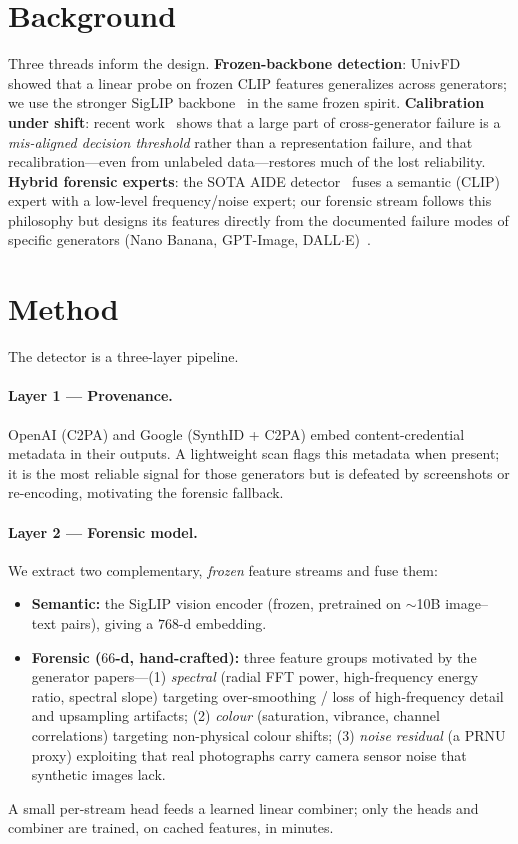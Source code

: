 \documentclass[11pt]{article}
\begin{document}
\section{Background}
Three threads inform the design. \textbf{Frozen-backbone detection}: UnivFD~\cite{univfd}
showed that a linear probe on frozen CLIP features generalizes across generators; we
use the stronger SigLIP backbone~\cite{siglip} in the same frozen spirit.
\textbf{Calibration under shift}: recent work~\cite{calibrated,conformal} shows that a
large part of cross-generator failure is a \emph{mis-aligned decision threshold} rather
than a representation failure, and that recalibration---even from unlabeled
data---restores much of the lost reliability. \textbf{Hybrid forensic experts}: the SOTA
AIDE detector~\cite{aide} fuses a semantic (CLIP) expert with a low-level frequency/noise
expert; our forensic stream follows this philosophy but designs its features directly
from the documented failure modes of specific generators (Nano Banana, GPT-Image,
DALL$\cdot$E)~\cite{nanobanana,gptimgeval,dalle3}.

\section{Method}
The detector is a three-layer pipeline.

\paragraph{Layer 1 --- Provenance.} OpenAI (C2PA) and Google (SynthID + C2PA) embed
content-credential metadata in their outputs. A lightweight scan flags this metadata
when present; it is the most reliable signal for those generators but is defeated by
screenshots or re-encoding, motivating the forensic fallback.

\paragraph{Layer 2 --- Forensic model.} We extract two complementary, \emph{frozen}
feature streams and fuse them:
\begin{itemize}
  \item \textbf{Semantic:} the SigLIP vision encoder (frozen, pretrained on
  $\sim$10B image--text pairs), giving a $768$-d embedding.
  \item \textbf{Forensic ($66$-d, hand-crafted):} three feature groups motivated by the
  generator papers---(1) \emph{spectral} (radial FFT power, high-frequency energy ratio,
  spectral slope) targeting over-smoothing / loss of high-frequency detail and
  upsampling artifacts; (2) \emph{colour} (saturation, vibrance, channel correlations)
  targeting non-physical colour shifts; (3) \emph{noise residual} (a PRNU proxy)
  exploiting that real photographs carry camera sensor noise that synthetic images lack.
\end{itemize}
A small per-stream head feeds a learned linear combiner; only the heads and combiner are
trained, on cached features, in minutes.
\end{document}
